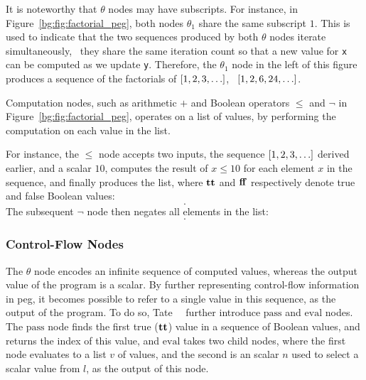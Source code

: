 It is noteworthy that $\theta$ nodes may have subscripts.  For instance,
in Figure~\ref{bg:fig:factorial_peg}, both nodes $\theta_1$ share the same
subscript $1$.  This is used to indicate that the two sequences produced
by both $\theta$ nodes iterate simultaneously, \ie~they share the same
iteration count so that a new value for \verb|x| can be computed as we update
\verb|y|.  Therefore, the $\theta_1$ node in the left of this figure produces
a sequence of the factorials of $[1, 2, 3, \mathellipsis]$, \ie~$[1, 2, 6, 24,
\mathellipsis]$.

Computation nodes, such as arithmetic $+$ and Boolean operators $\leq$ and
$\neg$ in Figure~\ref{bg:fig:factorial_peg}, operates on a list of values, by
performing the computation on each value in the list.

For instance, the $\leq$ node accepts two inputs, the sequence $[1, 2, 3,
\mathellipsis]$ derived earlier, and a scalar $10$, computes the result of $x
\leq 10$ for each element $x$ in the sequence, and finally produces the list,
where $\mathbf{tt}$ and $\mathbf{ff}$ respectively denote true and false Boolean
values:
\begin{equation}
    [
        \truelit, \truelit, \truelit, \truelit, \truelit,
        \truelit, \truelit, \truelit, \truelit, \truelit,
        \falselit, \falselit, \falselit, \mathellipsis
    ].
\end{equation}
The subsequent $\neg$ node then negates all elements in the list:
\begin{equation}
    [
        \falselit, \falselit, \falselit, \falselit, \falselit,
        \falselit, \falselit, \falselit, \falselit, \falselit,
        \truelit, \truelit, \truelit, \mathellipsis
    ].
    \label{bg:eq:bool_seq}
\end{equation}

\subsubsection{Control-Flow Nodes}

The $\theta$ node encodes an infinite sequence of computed values, whereas
the output value of the program is a scalar.  By further representing
control-flow information in \gls{peg}, it becomes possible to refer to a
single value in this sequence, as the output of the program.  To do so,
Tate~\etal~\cite{tate09} further introduce $\mathrm{pass}$ and $\mathrm{eval}$
nodes.  The $\mathrm{pass}$ node finds the first true ($\mathbf{tt}$) value
in a sequence of Boolean values, and returns the index of this value, and
$\mathrm{eval}$ takes two child nodes, where the first node evaluates to a list
$v$ of values, and the second is an scalar $n$ used to select a scalar value
from $l$, as the output of this node.

